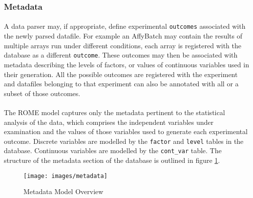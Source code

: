 \subsubsection{Metadata}
\label{sec:model_metadata}

\paragraph{}
A data parser may, if appropriate, define experimental \texttt{outcomes} associated with the newly parsed datafile. For example an AffyBatch may contain the results of multiple arrays run under different conditions, each array is registered with the database as a different \texttt{outcome}. These outcomes may then be associated with metadata describing the levels of factors, or values of continuous variables used in their generation. All the possible outcomes are registered with the experiment and datafiles belonging to that experiment can also be annotated with all or a subset of those outcomes. 


\paragraph{}
The ROME model captures only the metadata pertinent to the statistical analysis of the data, which comprises the independent variables under examination and the values of those variables used to generate each experimental outcome. Discrete variables are modelled by the \texttt{factor} and \texttt{level} tables in the database. Continuous variables are modelled by the \texttt{cont\_var} table. The structure of the metadata section of the database is outlined in figure \ref{fig:metadata_mod}. 

\begin{figure}
\centering
\caption{Metadata Model Overview}\label{fig:metadata_mod}
\texttt{[image: images/metadata]}
\end{figure}


